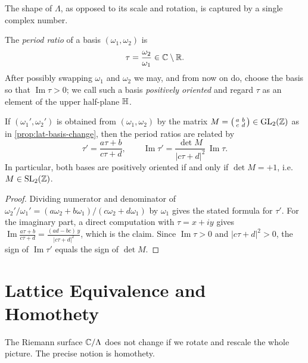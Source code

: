 The shape of \(\Lambda\), as opposed to its scale and rotation, is captured by a
single complex number.

\begin{definition}
\label{def:tau}
The \emph{period ratio} of a basis \((\omega_1, \omega_2)\) is
\[
  \tau = \frac{\omega_2}{\omega_1} \in \mathbb{C} \setminus \mathbb{R} .
\]
After possibly swapping \(\omega_1\) and \(\omega_2\) we may, and from now on do,
choose the basis so that \(\operatorname{Im}\tau > 0\); we call such a basis
\emph{positively oriented} and regard \(\tau\) as an element of the upper
half-plane \(\mathbb{H}\).
\end{definition}

\begin{proposition}
\label{prop:lat-tau-mobius}
If \((\omega_1', \omega_2')\) is obtained from \((\omega_1, \omega_2)\) by the
matrix \(M = \left(\begin{smallmatrix} a & b \\ c & d \end{smallmatrix}\right)
\in \mathrm{GL}_2(\mathbb{Z})\) as in \cref{prop:lat-basis-change}, then the period
ratios are related by
\[
  \tau' = \frac{a\tau + b}{c\tau + d},
  \qquad
  \operatorname{Im}\tau' = \frac{\det M}{|c\tau + d|^2}\,\operatorname{Im}\tau .
\]
In particular, both bases are positively oriented if and only if
\(\det M = +1\), i.e.\ \(M \in \mathrm{SL}_2(\mathbb{Z})\).
\end{proposition}

\begin{proof}
Dividing numerator and denominator of \(\omega_2'/\omega_1' =
(a\omega_2 + b\omega_1)/(c\omega_2 + d\omega_1)\) by \(\omega_1\) gives the stated
formula for \(\tau'\). For the imaginary part, a direct computation with
\(\tau = x + iy\) gives
\(\operatorname{Im}\frac{a\tau+b}{c\tau+d}
= \frac{(ad-bc)\,y}{|c\tau+d|^2}\), which is the claim. Since
\(\operatorname{Im}\tau > 0\) and \(|c\tau+d|^2 > 0\), the sign of
\(\operatorname{Im}\tau'\) equals the sign of \(\det M\).
\end{proof}

\section{Lattice Equivalence and Homothety}
\label{sec:lat-homothety}

The Riemann surface \(\mathbb{C}/\Lambda\) does not change if we rotate and rescale the
whole picture. The precise notion is homothety.

